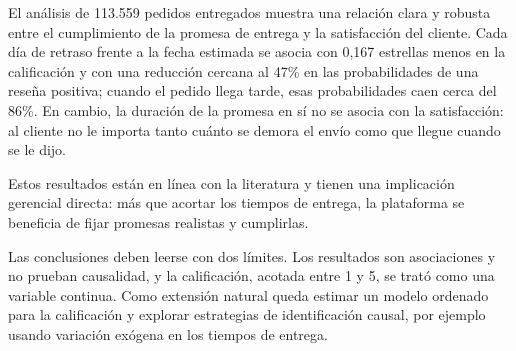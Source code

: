 \documentclass[11pt]{article}
\begin{document}
El análisis de 113.559 pedidos entregados muestra una relación clara y robusta
entre el cumplimiento de la promesa de entrega y la satisfacción del cliente.
Cada día de retraso frente a la fecha estimada se asocia con 0,167 estrellas
menos en la calificación y con una reducción cercana al 47\% en las
probabilidades de una reseña positiva; cuando el pedido llega tarde, esas
probabilidades caen cerca del 86\%. En cambio, la duración de la promesa en sí
no se asocia con la satisfacción: al cliente no le importa tanto cuánto se
demora el envío como que llegue cuando se le dijo.

Estos resultados están en línea con la literatura \parencite{akturk2022,
ravula2023, nozari2026} y tienen una implicación gerencial directa: más que
acortar los tiempos de entrega, la plataforma se beneficia de fijar promesas
realistas y cumplirlas.

Las conclusiones deben leerse con dos límites. Los resultados son
asociaciones y no prueban causalidad, y la calificación, acotada entre 1 y 5,
se trató como una variable continua. Como extensión natural queda estimar un
modelo ordenado para la calificación y explorar estrategias de identificación
causal, por ejemplo usando variación exógena en los tiempos de entrega.

\printbibliography
\end{document}
